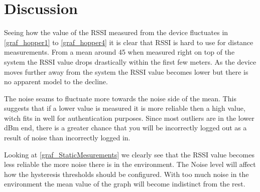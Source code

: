 \section{Discussion}
Seeing how the value of the RSSI measured from the device fluctuates in \cref{graf_hopper1} to \cref{graf_hopper4} it is clear that RSSI is hard to use for distance measurements.
From a mean around 45 when measured right on top of the system the RSSI value drops drastically within the first few meters.
As the device moves further away from the system the RSSI value becomes lower but there is no apparent model to the decline.

The noise seams to fluctuate more towards the noise side of the mean. This suggests that if a lower value is measured it is more reliable then a high value, witch fits in well for authentication purposes.
Since most outliers are in the lower dBm end, there is a greater chance that you will be incorrectly logged out as a result of noise than incorrectly logged in.

Looking at \cref{graf_StaticMesurements} we clearly see that the RSSI value becomes less reliable the more noise there is in the environment.
The Noise level will affect how the hysteresis thresholds should be configured.
With too much noise in the environment the mean value of the graph will become indistinct from the rest.

